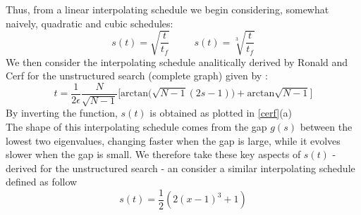         Thus, from a linear interpolating schedule we begin considering, somewhat naively, quadratic and cubic schedules:
        \begin{equation}
          s(t) = \sqrt{\frac{t}{t_f}} \hspace{30pt} s(t) = \sqrt[3]{\frac{t}{t_f}}
        \end{equation}
        We then consider the interpolating schedule analitically derived by Ronald and Cerf for the unstructured search (complete graph) given by :
        \begin{equation}
            t = \frac{1}{2\epsilon}\frac{N}{\sqrt{N-1}}\Big[\mbox{arctan}\big(\sqrt{N-1}(2s-1)\big) + \mbox{arctan}\sqrt{N-1}\Big]
        \end{equation}
        By inverting the function, $s(t)$ is obtained as plotted in \cref{cerf}(a) \\
        The shape of this interpolating schedule comes from the gap $g(s)$ between the lowest two eigenvalues, changing faster when the gap is large, while it evolves slower when the gap is small. We therefore take these key aspects of $s(t)$ - derived for the unstructured search - an consider a similar interpolating schedule defined as follow
        \begin{equation}
            s(t) = \frac{1}{2}(2(x-1)^{3}+1)
        \end{equation}
